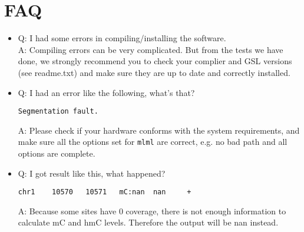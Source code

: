 \documentclass[11pt]{article}
\newcommand{\prog}[1]{\texttt{#1}}
\begin{document}
\section{FAQ}
\begin{itemize}
\item Q: I had some errors in compiling/installing the software.\\
A: Compiling errors can be very complicated. But from the tests we have done, we strongly recommend you to check your complier and GSL versions (see readme.txt) and make sure they are up to date and correctly installed.

\item Q: I had an error like the following, what's that?
\begin{verbatim}
Segmentation fault.
\end{verbatim}
A: Please check if your hardware conforms with the system requirements, and make sure all the options set for \prog{mlml} are correct, e.g. no bad path and all options are complete.

\item Q: I got result like this, what happened?
\begin{verbatim}
chr1    10570   10571   mC:nan  nan     +
\end{verbatim}
A: Because some sites have 0 coverage, there is not enough information to calculate mC and hmC levels. Therefore the output will be nan instead.
\end{itemize}
\end{document}
